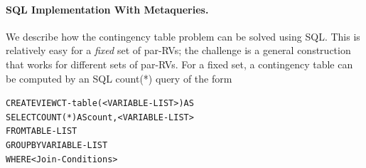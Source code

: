 \paragraph{SQL Implementation With Metaqueries.}
We describe how the contingency table problem can be solved using SQL. %
This is relatively easy for a {\em fixed} set of par-RVs; the challenge is a general construction that works for different sets of par-RVs. For a fixed set, a  contingency table can be computed by an SQL count(*) query of the form 
%
%
\begin{alltt}
CREATE VIEW CT-table(<VARIABLE-LIST>) AS
SELECT COUNT(*) AS count, <VARIABLE-LIST>
FROM TABLE-LIST
GROUP BY VARIABLE-LIST
WHERE <Join-Conditions>
\end{alltt}

